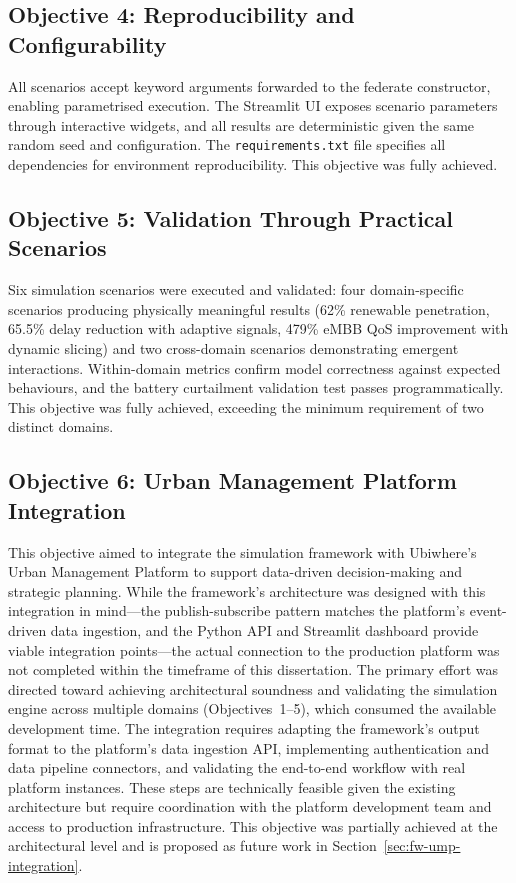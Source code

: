 \subsection{Objective 4: Reproducibility and Configurability}

All scenarios accept keyword arguments forwarded to the federate constructor, enabling parametrised execution. The Streamlit UI exposes scenario parameters through interactive widgets, and all results are deterministic given the same random seed and configuration. The \texttt{requirements.txt} file specifies all dependencies for environment reproducibility. This objective was fully achieved.

\subsection{Objective 5: Validation Through Practical Scenarios}

Six simulation scenarios were executed and validated: four domain-specific scenarios producing physically meaningful results (62\% renewable penetration, 65.5\% delay reduction with adaptive signals, 479\% eMBB QoS improvement with dynamic slicing) and two cross-domain scenarios demonstrating emergent interactions. Within-domain metrics confirm model correctness against expected behaviours, and the battery curtailment validation test passes programmatically. This objective was fully achieved, exceeding the minimum requirement of two distinct domains.

\subsection{Objective 6: Urban Management Platform Integration}

This objective aimed to integrate the simulation framework with Ubiwhere's Urban Management Platform to support data-driven decision-making and strategic planning. While the framework's architecture was designed with this integration in mind---the publish-subscribe pattern matches the platform's event-driven data ingestion, and the Python API and Streamlit dashboard provide viable integration points---the actual connection to the production platform was not completed within the timeframe of this dissertation. The primary effort was directed toward achieving architectural soundness and validating the simulation engine across multiple domains (Objectives~1--5), which consumed the available development time. The integration requires adapting the framework's output format to the platform's data ingestion API, implementing authentication and data pipeline connectors, and validating the end-to-end workflow with real platform instances. These steps are technically feasible given the existing architecture but require coordination with the platform development team and access to production infrastructure. This objective was partially achieved at the architectural level and is proposed as future work in Section~\ref{sec:fw-ump-integration}.


